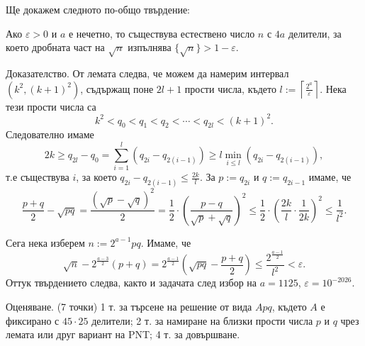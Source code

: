 Ще докажем следното по-общо твърдение:

Ако $\varepsilon>0$ и $a$ е нечетно, то съществува естествено число $n$ с $4a$ делители, за което дробната част на $\sqrt n$ изпълнява $\{\sqrt n\}>1-\varepsilon$.

Доказателство. От лемата следва, че можем да намерим интервал $(k^2,(k+1)^2)$, съдържащ поне $2l+1$ прости числа, където $l:=\left\lceil\frac{2^a}{\varepsilon}\right\rceil$. Нека тези прости числа са
$$k^2<q_0<q_1<q_2<\cdots<q_{2l}<(k+1)^2.$$
Следователно имаме
$$2k\ge q_{2l}-q_0=\sum_{i=1}^l(q_{2i}-q_{2(i-1)})\ge l\min_{i\le l}(q_{2i}-q_{2(i-1)}),$$
т.е съществува $i$, за което $q_{2i}-q_{2(i-1)}\le\frac{2k}{l}$. За $p:=q_{2i}$ и $q:=q_{2i-1}$ имаме, че
$$\frac{p+q}{2}-\sqrt{pq}=\frac{(\sqrt p-\sqrt q)^2}{2}=\frac12\cdot\left(\frac{p-q}{\sqrt p+\sqrt q}\right)^2\le\frac12\cdot\left(\frac{2k}{l}\cdot\frac1{2k}\right)^2\le\frac1{l^2}.$$

Сега нека изберем $n:=2^{a-1}pq$. Имаме, че
$$\sqrt n-2^{\frac{a-3}{2}}(p+q)=2^{\frac{a-1}{2}}\left(\sqrt{pq}-\frac{p+q}{2}\right)\le\frac{2^{\frac{a-1}{2}}}{l^2}<\varepsilon.$$
Оттук твърдението следва, както и задачата след избор на $a=1125$, $\varepsilon=10^{-2026}$.

Оценяване. (7 точки) 1 т. за търсене на решение от вида $Apq$, където $A$ е фиксирано с $45\cdot25$ делители; 2 т. за намиране на близки прости числа $p$ и $q$ чрез лемата или друг вариант на PNT; 4 т. за довършване.
